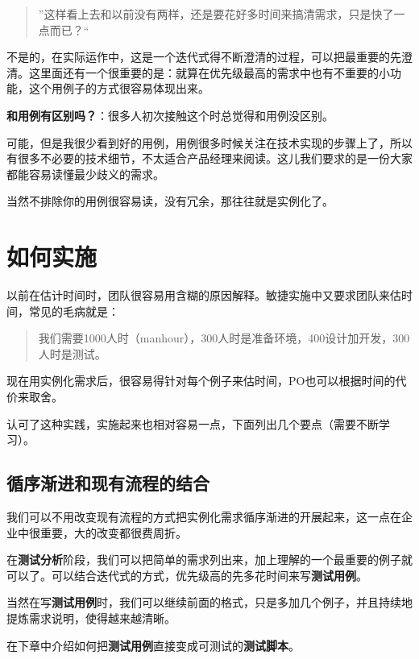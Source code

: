 \begin{quote}

”这样看上去和以前没有两样，还是要花好多时间来搞清需求，只是快了一点而已？“
\end{quote}

不是的，在实际运作中，这是一个迭代式得不断澄清的过程，可以把最重要的先澄清。这里面还有一个很重要的是：就算在优先级最高的需求中也有不重要的小功能，这个用例子的方式很容易体现出来。

\textbf{和用例有区别吗？}：很多人初次接触这个时总觉得和用例没区别。

可能，但是我很少看到好的用例，用例很多时候关注在技术实现的步骤上了，所以有很多不必要的技术细节，不太适合产品经理来阅读。这儿我们要求的是一份大家都能容易读懂最少歧义的需求。

当然不排除你的用例很容易读，没有冗余，那往往就是实例化了。

\section{如何实施}
\label{如何实施}

以前在估计时间时，团队很容易用含糊的原因解释。敏捷实施中又要求团队来估时间，常见的毛病就是：

\begin{quote}

我们需要1000人时（manhour），300人时是准备环境，400设计加开发，300人时是测试。
\end{quote}

现在用实例化需求后，很容易得针对每个例子来估时间，PO也可以根据时间的代价来取舍。

认可了这种实践，实施起来也相对容易一点，下面列出几个要点（需要不断学习）。

\subsection{循序渐进和现有流程的结合}
\label{循序渐进和现有流程的结合}

我们可以不用改变现有流程的方式把实例化需求循序渐进的开展起来，这一点在企业中很重要，大的改变都很费周折。

在\textbf{测试分析}阶段，我们可以把简单的需求列出来，加上理解的一个最重要的例子就可以了。可以结合迭代式的方式，优先级高的先多花时间来写\textbf{测试用例}。

当然在写\textbf{测试用例}时，我们可以继续前面的格式，只是多加几个例子，并且持续地提炼需求说明，使得越来越清晰。

在下章中介绍如何把\textbf{测试用例}直接变成可测试的\textbf{测试脚本}。

